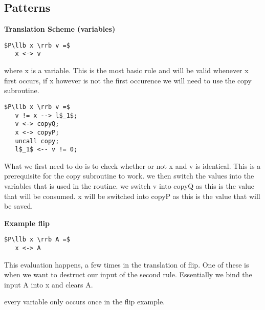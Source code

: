 \documentclass[a4paper]{article}
\begin{document}
\subsection{Patterns}
\label{sec:org984c7af}
\begin{minipage}[t]{0.6\textwidth}
\textbf{Translation Scheme (variables)}
\begin{lstlisting}
$P\llb x \rrb v =$
   x <-> v
\end{lstlisting}
where x is a variable. This is the most basic rule and will be valid whenever x first occurs, if x however is not the first occurence we will need to use the copy subroutine.
\begin{lstlisting}
$P\llb x \rrb v =$
   v != x --> l$_1$;
   v <-> copyQ;
   x <-> copyP;
   uncall copy;
   l$_1$ <-- v != 0;
\end{lstlisting}
What we first need to do is to check whether or not x and v is identical. This is a prerequisite for the copy subroutine to work. we then switch the values into the variables that is used in the routine. we switch v into copyQ as this is the value that will be consumed. x will be switched into copyP as this is the value that will be saved.
\end{minipage}
\qquad
\begin{minipage}[t]{0.4\textwidth}
\textbf{Example flip}
\begin{lstlisting}
$P\llb x \rrb A =$
   x <-> A
\end{lstlisting}
This evaluation happens, a few times in the translation of flip. One of these is when we want to destruct our input of the second rule. Essentially we bind the input A into x and clears A.

every variable only occurs once in the flip example.
\end{minipage}
\end{document}
